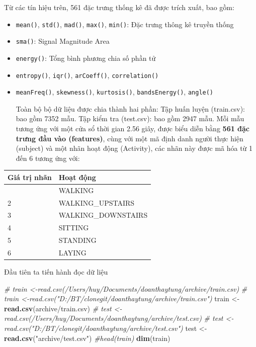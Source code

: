 \documentclass[
]{article}
\newenvironment{Shaded}{\begin{snugshade}}{\end{snugshade}}
\newcommand{\CommentTok}[1]{\textcolor[rgb]{0.56,0.35,0.01}{\textit{#1}}}
\newcommand{\FunctionTok}[1]{\textcolor[rgb]{0.13,0.29,0.53}{\textbf{#1}}}
\newcommand{\NormalTok}[1]{#1}
\newcommand{\OtherTok}[1]{\textcolor[rgb]{0.56,0.35,0.01}{#1}}
\newcommand{\StringTok}[1]{\textcolor[rgb]{0.31,0.60,0.02}{#1}}
\begin{document}
Từ các tín hiệu trên, 561 đặc trưng thống kê đã được trích xuất, bao
gồm:

\begin{itemize}
\item
  \texttt{mean()}, \texttt{std()}, \texttt{mad()}, \texttt{max()},
  \texttt{min()}: Đặc trưng thông kê truyền thống
\item
  \texttt{sma()}: Signal Magnitude Area
\item
  \texttt{energy()}: Tổng bình phương chia số phần tử
\item
  \texttt{entropy()}, \texttt{iqr()}, \texttt{arCoeff()},
  \texttt{correlation()}
\item
  \texttt{meanFreq()}, \texttt{skewness()}, \texttt{kurtosis()},
  \texttt{bandsEnergy()}, \texttt{angle()}

  Toàn bộ bộ dữ liệu được chia thành hai phần: Tập huấn luyện
  (train.csv): bao gồm 7352 mẫu. Tập kiểm tra (test.csv): bao gồm 2947
  mẫu. Mỗi mẫu tương ứng với một cửa sổ thời gian 2.56 giây, được biểu
  diễn bằng \textbf{561 đặc trưng đầu vào (features)}, cùng với một mã
  định danh người thực hiện (subject) và một nhãn hoạt động (Activity),
  các nhãn này được mã hóa từ 1 đến 6 tương ứng với:
\end{itemize}

\begin{longtable}[]{@{}ll@{}}
\toprule\noalign{}
Giá trị nhãn & Hoạt động \\
\midrule\noalign{}
\endhead
\bottomrule\noalign{}
\endlastfoot
1 & WALKING \\
2 & WALKING\_UPSTAIRS \\
3 & WALKING\_DOWNSTAIRS \\
4 & SITTING \\
5 & STANDING \\
6 & LAYING \\
\end{longtable}

Đầu tiên ta tiến hành đọc dữ liệu

\begin{Shaded}
\begin{Highlighting}[]
\CommentTok{\# train \textless{}{-}read.csv(\textquotesingle{}/Users/huy/Documents/doanthaytung/archive/train.csv\textquotesingle{})}
\CommentTok{\# train \textless{}{-}read.csv("D:/BT/clonegit/doanthaytung/archive/train.csv")}
\NormalTok{train }\OtherTok{\textless{}{-}} \FunctionTok{read.csv}\NormalTok{(}\StringTok{\textquotesingle{}archive/train.csv\textquotesingle{}}\NormalTok{)}
\CommentTok{\# test \textless{}{-}read.csv(\textquotesingle{}/Users/huy/Documents/doanthaytung/archive/test.csv\textquotesingle{})}
\CommentTok{\# test \textless{}{-}read.csv("D:/BT/clonegit/doanthaytung/archive/test.csv")}
\NormalTok{test }\OtherTok{\textless{}{-}} \FunctionTok{read.csv}\NormalTok{(}\StringTok{"archive/test.csv"}\NormalTok{)}
\CommentTok{\#head(train)}
\FunctionTok{dim}\NormalTok{(train)}
\end{Highlighting}
\end{Shaded}
\end{document}
